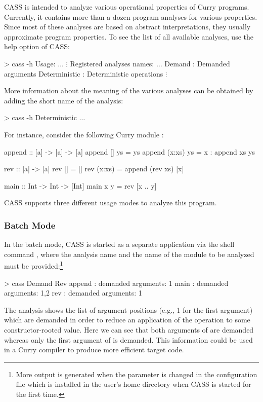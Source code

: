 CASS is intended to analyze various operational properties
of Curry programs. Currently, it contains more than a dozen
program analyses for various properties.
Since most of these analyses are based on abstract interpretations,
they usually approximate program properties.
To see the list of all available analyses, use the help option of CASS:
\begin{curry}
> cass -h
Usage: $\ldots$
$\vdots$
Registered analyses names:
$\ldots$
Demand          : Demanded arguments
Deterministic   : Deterministic operations
$\vdots$
\end{curry}
More information about the meaning of the various analyses
can be obtained by adding the short name of the analysis:
\begin{curry}
> cass -h Deterministic
$\ldots$
\end{curry}
For instance, consider the following Curry module :
\begin{curry}
append :: [a] -> [a] -> [a]
append []     ys = ys
append (x:xs) ys = x : append xs ys

rev :: [a] -> [a]
rev []     = []
rev (x:xs) = append (rev xs) [x]

main :: Int -> Int -> [Int]
main x y = rev [x .. y]
\end{curry}
%
CASS supports three different usage modes to analyze this program.

\subsubsection{Batch Mode}

In the batch mode, CASS is started as a separate application
via the shell command ,
where the analysis name and the name of the module to be analyzed
must be provided:\footnote{More output is generated when
the parameter  is changed in the configuration file
 which is installed in the user's home directory
when CASS is started for the first time.}
\begin{curry}
> cass Demand Rev
append : demanded arguments: 1
main : demanded arguments: 1,2
rev : demanded arguments: 1
\end{curry}
The  analysis shows the list of argument positions
(e.g., 1 for the first argument) which are demanded in order
to reduce an application of the operation to some constructor-rooted value.
Here we can see that both arguments of  are demanded
whereas only the first argument of  is demanded.
This information could be used in a Curry compiler
to produce more efficient target code.

